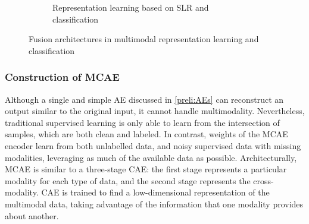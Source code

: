 \begin{figure}
\begin{subfigure}{0.48\linewidth}
		\caption{Representation learning based on SLR and classification}
        \label{fig:slr_11}
	\end{subfigure}
	\caption{Fusion architectures in multimodal representation learning and classification} 
	\label{fig:mm_rL_example1}
\end{figure}

\iffalse
\subsubsection{Construction of MCAE}
Although a single and simple AE discussed in \cref{preli:AEs} can reconstruct an output similar to the original input, it cannot handle multimodality. Nevertheless, traditional supervised learning is only able to learn from the intersection of samples, which are both clean and labeled. In contrast, weights of the MCAE encoder learn from both unlabelled data, and noisy supervised data with missing modalities, leveraging as much of the available data as possible. Architecturally, MCAE is similar to a three-stage CAE: the first stage represents a particular modality for each type of data, and the second stage represents the cross-modality. CAE is trained to find a low-dimensional representation of the multimodal data, taking advantage of the information that one modality provides about another. 


